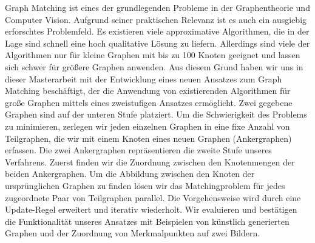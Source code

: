 Graph Matching ist eines der grundlegenden Probleme in der Graphentheorie und Computer Vision. Aufgrund seiner praktischen Relevanz ist es auch ein ausgiebig erforschtes Problemfeld. Es existieren viele approximative Algorithmen, die in der Lage sind schnell eine hoch qualitative Lösung zu liefern. Allerdings sind viele der Algorithmen nur für kleine Graphen mit bis zu 100 Knoten geeignet und lassen sich schwer für größere Graphen anwenden. Aus diesem Grund haben wir uns in dieser Masterarbeit mit der Entwicklung eines neuen Ansatzes zum Graph Matching beschäftigt, der die Anwendung von existierenden Algorithmen für große Graphen mittels eines zweistufigen Ansatzes ermöglicht. Zwei gegebene Graphen sind auf der unteren Stufe platziert. Um die Schwierigkeit des Problems zu minimieren, zerlegen wir jeden einzelnen Graphen in eine fixe Anzahl von Teilgraphen, die wir mit einem Knoten eines neuen Graphen (Ankergraphen) erfassen. Die zwei Ankergraphen repräsentieren die zweite Stufe unseres Verfahrens. Zuerst finden wir die Zuordnung zwischen den Knotenmengen der beiden Ankergraphen. Um die Abbildung zwischen den Knoten der ursprünglichen Graphen zu finden lösen wir das Matchingproblem  für jedes zugeordnete Paar von Teilgraphen parallel. Die Vorgehensweise wird durch eine Update-Regel erweitert und iterativ wiederholt. Wir evaluieren und best\"{a}tigen die Funktionalit\"{a}t unseres Ansatzes mit Beispielen von künstlich generierten Graphen und der Zuordnung von Merkmalpunkten auf zwei Bildern.